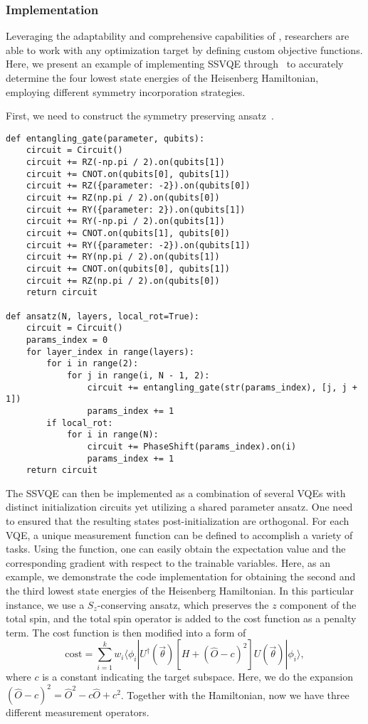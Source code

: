 \subsubsection{Implementation}
Leveraging the adaptability and comprehensive capabilities of \MindQuantum, researchers are able to work with any optimization target by defining custom objective functions. Here, we present an example of implementing SSVQE through \MindQuantum\ to accurately determine the four lowest state energies of the Heisenberg Hamiltonian, employing different symmetry incorporation strategies.

First, we need to construct the symmetry preserving ansatz~\cite{?}.
\begin{lstlisting}
def entangling_gate(parameter, qubits):
    circuit = Circuit()
    circuit += RZ(-np.pi / 2).on(qubits[1])
    circuit += CNOT.on(qubits[0], qubits[1])
    circuit += RZ({parameter: -2}).on(qubits[0])
    circuit += RZ(np.pi / 2).on(qubits[0])
    circuit += RY({parameter: 2}).on(qubits[1])
    circuit += RY(-np.pi / 2).on(qubits[1])
    circuit += CNOT.on(qubits[1], qubits[0])
    circuit += RY({parameter: -2}).on(qubits[1])
    circuit += RY(np.pi / 2).on(qubits[1])
    circuit += CNOT.on(qubits[0], qubits[1])
    circuit += RZ(np.pi / 2).on(qubits[0])
    return circuit

def ansatz(N, layers, local_rot=True):
    circuit = Circuit()
    params_index = 0
    for layer_index in range(layers):
        for i in range(2):
            for j in range(i, N - 1, 2):
                circuit += entangling_gate(str(params_index), [j, j + 1])
                params_index += 1
        if local_rot:
            for i in range(N):
                circuit += PhaseShift(params_index).on(i)
                params_index += 1
    return circuit
\end{lstlisting}

The SSVQE can then be implemented as a combination of several VQEs with distinct initialization circuits yet utilizing a shared parameter ansatz. One need to ensured that the resulting states post-initialization are orthogonal.
For each VQE, a unique measurement function can be defined to accomplish a variety of tasks.
Using the \getexpectationwithgrad function, one can easily obtain the expectation value and the corresponding gradient with respect to the trainable variables. Here, as an example, we demonstrate the code implementation for obtaining the second and the third lowest state energies of the Heisenberg Hamiltonian. In this particular instance,
we use a $S_z$-conserving ansatz, which preserves the $z$ component of the total spin, and the total spin operator is added to the cost function as a penalty term. The cost function is then modified into a form of
\begin{equation}
    \mathrm{cost} = \sum_{i=1}^{k} w_{i} \langle \phi_{i}| U^{\dagger}(\vec{\theta}) [H + (\hat{O} - c)^2] U(\vec{\theta}) | \phi_{i} \rangle,
    \label{ssvqe_cost_pen}
\end{equation}
where $c$ is a constant indicating the target subspace. Here, we do the expansion $(\hat{O} - c)^2 {=} \hat{O}^2 {-} c\hat{O} {+} c^2$. Together with the Hamiltonian, now we have three different measurement operators.

